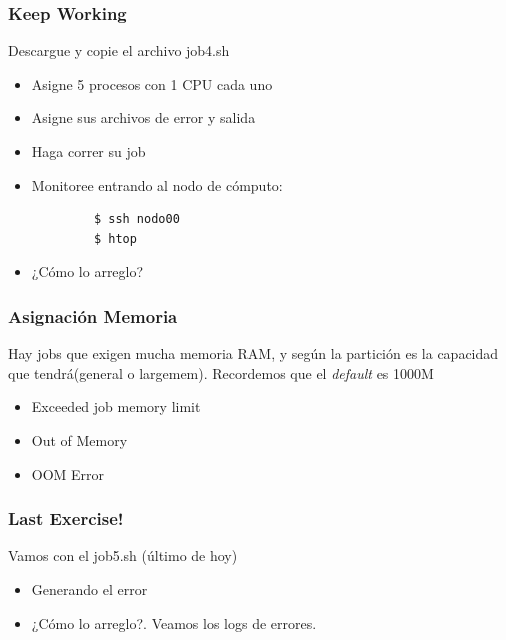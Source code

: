 \documentclass[aspectratio=169,professionalfonts]{beamer}
\begin{document}
\begin{frame}[fragile]
\frametitle{\textbf{Keep Working}}
Descargue y copie el archivo job4.sh
    \begin{itemize}
        \item Asigne 5 procesos con 1 CPU cada uno 
         \vspace{0.5em} 
        \item Asigne sus archivos de error y salida
         \vspace{0.5em} 
        \item Haga correr su job 
         \vspace{0.5em} 
        \item Monitoree entrando al nodo de cómputo: 
        \end{itemize}
        \begin{verbatim}
            $ ssh nodo00
            $ htop
        \end{verbatim}
      \begin{itemize}
          \item¿Cómo lo arreglo?
      \end{itemize}
  
\end{frame}

\begin{frame}[fragile]
\frametitle{\textbf{Asignación Memoria}}
    Hay jobs que exigen mucha memoria RAM, y según la partición es la capacidad que tendrá(general o largemem). Recordemos que el \textit{default} es 1000M
    \begin{itemize}
        \item Exceeded job memory limit 
         \vspace{0.5em} 
        \item Out of Memory 
         \vspace{0.5em} 
        \item OOM Error 
    \end{itemize}
\end{frame}


\begin{frame}[fragile]
\frametitle{\textbf{Last Exercise!}}
Vamos con el job5.sh (último de hoy)
\begin{itemize}
    \item Generando el error
     \vspace{0.5em} 
    \item ¿Cómo lo arreglo?. Veamos los logs de errores. 
\end{itemize}
    
\end{frame}
\end{document}
